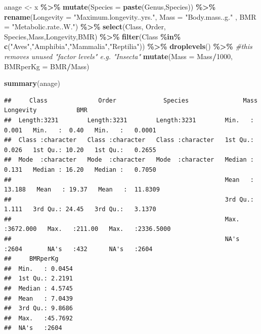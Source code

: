\documentclass[
  a4paperpaper,
]{book}
\newenvironment{Shaded}{\begin{snugshade}}{\end{snugshade}}
\newcommand{\CommentTok}[1]{\textcolor[rgb]{0.56,0.35,0.01}{\textit{#1}}}
\newcommand{\DataTypeTok}[1]{\textcolor[rgb]{0.13,0.29,0.53}{#1}}
\newcommand{\DecValTok}[1]{\textcolor[rgb]{0.00,0.00,0.81}{#1}}
\newcommand{\KeywordTok}[1]{\textcolor[rgb]{0.13,0.29,0.53}{\textbf{#1}}}
\newcommand{\NormalTok}[1]{#1}
\newcommand{\OperatorTok}[1]{\textcolor[rgb]{0.81,0.36,0.00}{\textbf{#1}}}
\newcommand{\StringTok}[1]{\textcolor[rgb]{0.31,0.60,0.02}{#1}}
\begin{document}
\begin{Shaded}
\begin{Highlighting}[]
\NormalTok{anage \textless{}{-}}\StringTok{ }\NormalTok{x }\OperatorTok{\%\textgreater{}\%}\StringTok{ }
\StringTok{  }\KeywordTok{mutate}\NormalTok{(}\DataTypeTok{Species =} \KeywordTok{paste}\NormalTok{(Genus,Species)) }\OperatorTok{\%\textgreater{}\%}
\StringTok{  }\KeywordTok{rename}\NormalTok{(}\DataTypeTok{Longevity =} \StringTok{"Maximum.longevity..yrs."}\NormalTok{,}
         \DataTypeTok{Mass =} \StringTok{"Body.mass..g."}\NormalTok{ ,}
         \DataTypeTok{BMR =} \StringTok{"Metabolic.rate..W."}\NormalTok{) }\OperatorTok{\%\textgreater{}\%}
\StringTok{  }\KeywordTok{select}\NormalTok{(Class, Order, Species,Mass,Longevity,BMR) }\OperatorTok{\%\textgreater{}\%}
\StringTok{  }\KeywordTok{filter}\NormalTok{(Class }\OperatorTok{\%in\%}\StringTok{ }\KeywordTok{c}\NormalTok{(}\StringTok{"Aves"}\NormalTok{,}\StringTok{"Amphibia"}\NormalTok{,}\StringTok{"Mammalia"}\NormalTok{,}\StringTok{"Reptilia"}\NormalTok{)) }\OperatorTok{\%\textgreater{}\%}\StringTok{ }
\StringTok{  }\KeywordTok{droplevels}\NormalTok{() }\OperatorTok{\%\textgreater{}\%}\StringTok{ }\CommentTok{\#this removes unused "factor levels" e.g. "Insecta"}
\StringTok{  }\KeywordTok{mutate}\NormalTok{(}\DataTypeTok{Mass =}\NormalTok{ Mass}\OperatorTok{/}\DecValTok{1000}\NormalTok{,}
         \DataTypeTok{BMRperKg =}\NormalTok{ BMR}\OperatorTok{/}\NormalTok{Mass) }

\KeywordTok{summary}\NormalTok{(anage)  }
\end{Highlighting}
\end{Shaded}

\begin{verbatim}
##     Class              Order             Species               Mass            Longevity           BMR           
##  Length:3231        Length:3231        Length:3231        Min.   :   0.001   Min.   :  0.40   Min.   :   0.0001  
##  Class :character   Class :character   Class :character   1st Qu.:   0.026   1st Qu.: 10.20   1st Qu.:   0.2655  
##  Mode  :character   Mode  :character   Mode  :character   Median :   0.131   Median : 16.20   Median :   0.7050  
##                                                           Mean   :  13.188   Mean   : 19.37   Mean   :  11.8309  
##                                                           3rd Qu.:   1.111   3rd Qu.: 24.45   3rd Qu.:   3.1370  
##                                                           Max.   :3672.000   Max.   :211.00   Max.   :2336.5000  
##                                                           NA's   :2604       NA's   :432      NA's   :2604       
##     BMRperKg      
##  Min.   : 0.0454  
##  1st Qu.: 2.2191  
##  Median : 4.5745  
##  Mean   : 7.0439  
##  3rd Qu.: 9.8686  
##  Max.   :45.7692  
##  NA's   :2604
\end{verbatim}
\end{document}
